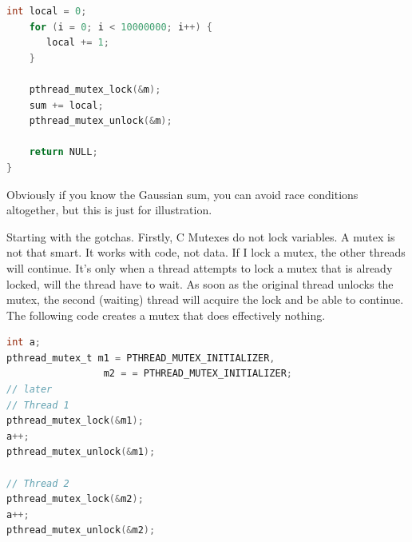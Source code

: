 \begin{lstlisting}[language=C]
    int local = 0;
    for (i = 0; i < 10000000; i++) {
       local += 1;
    }

    pthread_mutex_lock(&m);
    sum += local;
    pthread_mutex_unlock(&m);

    return NULL;
}
\end{lstlisting}

Obviously if you know the Gaussian sum, you can avoid race conditions altogether, but this is just for illustration.

Starting with the gotchas.
Firstly, C Mutexes do not lock variables.
A mutex is not that smart.
It works with code, not data.
If I lock a mutex, the other threads will continue.
It's only when a thread attempts to lock a mutex that is already locked, will the thread have to wait.
As soon as the original thread unlocks the mutex, the second (waiting) thread will acquire the lock and be able to continue.
The following code creates a mutex that does effectively nothing.

\begin{lstlisting}[language=C]
int a;
pthread_mutex_t m1 = PTHREAD_MUTEX_INITIALIZER,
                 m2 = = PTHREAD_MUTEX_INITIALIZER;
// later
// Thread 1
pthread_mutex_lock(&m1);
a++;
pthread_mutex_unlock(&m1);

// Thread 2
pthread_mutex_lock(&m2);
a++;
pthread_mutex_unlock(&m2);
\end{lstlisting}

